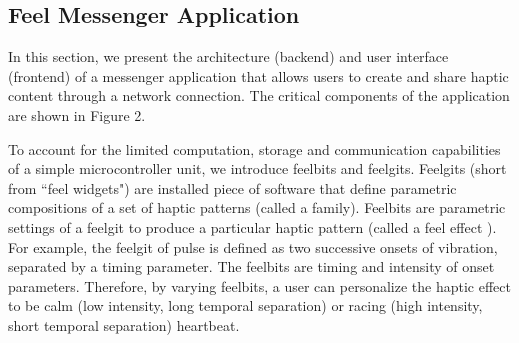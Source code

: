%
%
%
%
%

\subsection{Feel Messenger Application}
In this section, we present the architecture (backend) and user interface (frontend) of a messenger application that allows users to create and share haptic content through a network connection. The critical components of the application are shown in Figure 2.

To account for the limited computation, storage and communication capabilities of a simple microcontroller unit, we introduce feelbits and feelgits. Feelgits (short from ``feel widgets") are installed piece of software that define parametric compositions of a set of haptic patterns (called a family). Feelbits are parametric settings of a feelgit to produce a particular haptic pattern (called a feel effect \cite{Israr2014}). For example, the feelgit of pulse is defined as two successive onsets of vibration, separated by a timing parameter. The feelbits are timing and intensity of onset parameters. Therefore, by varying feelbits, a user can personalize the haptic effect to be calm (low intensity, long temporal separation) or racing (high intensity, short temporal separation) heartbeat.

